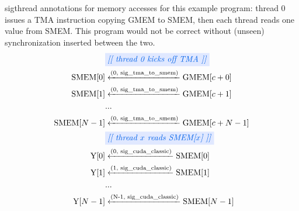 \filbreak
{} sigthread annotations for memory accesses for this example program: thread 0 issues a TMA instruction copying \textsf{GMEM} to \textsf{SMEM}, then each thread reads one value from \textsf{SMEM}.
This program would not be correct without (unseen) synchronization inserted between the two.
{\sffamily
\begin{align*}
    & \blueBox{\textit{[[ thread 0 kicks off TMA ]]}} \\
    \text{SMEM[$0$]} & \xleftarrow{\text{(0, sig\_tma\_to\_smem)}} \text{GMEM[$c+0$]} \\
    \text{SMEM[$1$]} & \xleftarrow{\text{(0, sig\_tma\_to\_smem)}} \text{GMEM[$c+1$]} \\
    & ... \\
    \text{SMEM[$N-1$]} & \xleftarrow{\text{(0, sig\_tma\_to\_smem)}} \text{GMEM[$c+N-1$]} \\
    & \blueBox{\textit{[[ thread $x$ reads SMEM[$x$] ]]}} \\
    \text{Y[$0$]} & \xleftarrow{\text{(0, sig\_cuda\_classic)}} \text{SMEM[$0$]} \\
    \text{Y[$1$]} & \xleftarrow{\text{(1, sig\_cuda\_classic)}} \text{SMEM[$1$]} \\
    & ... \\
    \text{Y[$N-1$]} & \xleftarrow{\text{(N-1, sig\_cuda\_classic)}} \text{SMEM[$N-1$]} \\
\end{align*}
}



\filbreak
{}



